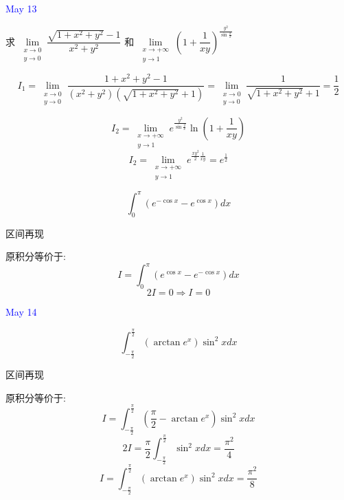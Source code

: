 \textcolor{blue}{May 13}

\begin{example}[][Exam: 31.2.11]
	求 $\lim\limits_{\substack{x\to 0\\ y\to 0}}\dfrac{\sqrt{1+x^2+y^2}-1}{x^2+y^2}$ 和
	$\lim\limits_{\substack{x\to +\infty\\ y\to 1}}\left( 1+\dfrac{1}{xy}\right)^{\frac{y^2}{\sin\frac{2}{x}}}$
\end{example}

\begin{solution}
	$$I_{1}=\lim\limits_{\substack{x\to 0\\ y\to 0}}\dfrac{1+x^2+y^2-1}{(x^2+y^2)(\sqrt{1+x^2+y^2}+1)}=\lim\limits_{\substack{x\to 0\\ y\to 0}}\dfrac{1}{\sqrt{1+x^2+y^2}+1}=\frac{1}{2}$$
	
	$$I_{2}=\lim\limits_{\substack{x\to +\infty\\ y\to 1}}e^{\frac{y^2}{\sin\frac{2}{x}}}\ln(1+\frac{1}{xy})$$
	$$I_{2}=\lim\limits_{\substack{x\to +\infty\\ y\to 1}}e^{\frac{xy^2}{2}\frac{1}{xy}}=e^{\frac{1}{2}}$$
\end{solution}

\begin{example}[][Exam: 31.2.12]
	$$\int_{0}^{\pi}\left( e^{-\cos x}-e^{\cos x}\right)dx$$
\end{example}

\begin{solution}
	
	区间再现
	
	原积分等价于: 
	$$I=\int_{0}^{\pi}\left( e^{\cos x}-e^{-\cos x}\right)dx$$
	$$2I=0\Rightarrow I=0$$
\end{solution}


\textcolor{blue}{May 14}

\begin{example}[][Exam: 31.2.13]
	$$\int_{-\frac{\pi}{2}}^{\frac{\pi}{2}}\left( \arctan e^{x}\right)\sin^{2}xdx$$
\end{example}

\begin{solution}
	
	区间再现
	
	原积分等价于: 
	$$I=\int_{-\frac{\pi}{2}}^{\frac{\pi}{2}}(\frac{\pi}{2}-\arctan e^{x})\sin^{2}xdx$$
	$$2I=\frac{\pi}{2}\int_{-\frac{\pi}{2}}^{\frac{\pi}{2}}\sin^{2}xdx=\frac{\pi^{2}}{4}$$
	$$I=\int_{-\frac{\pi}{2}}^{\frac{\pi}{2}}\left( \arctan e^{x}\right)\sin^{2}xdx=\frac{\pi^{2}}{8}$$
\end{solution}


